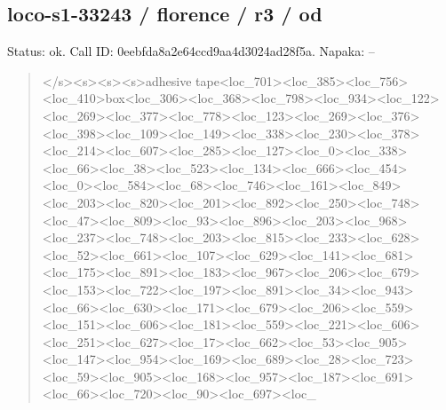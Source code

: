 \documentclass[10pt,a4paper]{article}
\begin{document}
\subsection*{loco-s1-33243 / florence / r3 / od}
Status: ok. Call ID: 0eebfda8a2e64ccd9aa4d3024ad28f5a. Napaka: --
\begin{quote}\footnotesize
</s>\allowbreak{}<s>\allowbreak{}<s>\allowbreak{}<s>\allowbreak{}adhesive tape<loc\_701>\allowbreak{}<loc\_385>\allowbreak{}<loc\_756>\allowbreak{}<\allowbreak{}loc\_410>\allowbreak{}box<loc\_306>\allowbreak{}<loc\_368>\allowbreak{}<lo\allowbreak{}c\_798>\allowbreak{}<loc\_934>\allowbreak{}<loc\_122>\allowbreak{}<loc\_269\allowbreak{}>\allowbreak{}<loc\_377>\allowbreak{}<loc\_778>\allowbreak{}<loc\_123>\allowbreak{}<loc\allowbreak{}\_269>\allowbreak{}<loc\_376>\allowbreak{}<loc\_398>\allowbreak{}<loc\_109>\allowbreak{}\allowbreak{}<loc\_149>\allowbreak{}<loc\_338>\allowbreak{}<loc\_230>\allowbreak{}<loc\_\allowbreak{}378>\allowbreak{}<loc\_214>\allowbreak{}<loc\_607>\allowbreak{}<loc\_285>\allowbreak{}<\allowbreak{}loc\_127>\allowbreak{}<loc\_0>\allowbreak{}<loc\_338>\allowbreak{}<loc\_66>\allowbreak{}\allowbreak{}<loc\_38>\allowbreak{}<loc\_523>\allowbreak{}<loc\_134>\allowbreak{}<loc\_6\allowbreak{}66>\allowbreak{}<loc\_454>\allowbreak{}<loc\_0>\allowbreak{}<loc\_584>\allowbreak{}<loc\allowbreak{}\_68>\allowbreak{}<loc\_746>\allowbreak{}<loc\_161>\allowbreak{}<loc\_849>\allowbreak{}<\allowbreak{}loc\_203>\allowbreak{}<loc\_820>\allowbreak{}<loc\_201>\allowbreak{}<loc\_8\allowbreak{}92>\allowbreak{}<loc\_250>\allowbreak{}<loc\_748>\allowbreak{}<loc\_47>\allowbreak{}<lo\allowbreak{}c\_809>\allowbreak{}<loc\_93>\allowbreak{}<loc\_896>\allowbreak{}<loc\_203>\allowbreak{}\allowbreak{}<loc\_968>\allowbreak{}<loc\_237>\allowbreak{}<loc\_748>\allowbreak{}<loc\_\allowbreak{}203>\allowbreak{}<loc\_815>\allowbreak{}<loc\_233>\allowbreak{}<loc\_628>\allowbreak{}<\allowbreak{}loc\_52>\allowbreak{}<loc\_661>\allowbreak{}<loc\_107>\allowbreak{}<loc\_62\allowbreak{}9>\allowbreak{}<loc\_141>\allowbreak{}<loc\_681>\allowbreak{}<loc\_175>\allowbreak{}<lo\allowbreak{}c\_891>\allowbreak{}<loc\_183>\allowbreak{}<loc\_967>\allowbreak{}<loc\_206\allowbreak{}>\allowbreak{}<loc\_679>\allowbreak{}<loc\_153>\allowbreak{}<loc\_722>\allowbreak{}<loc\allowbreak{}\_197>\allowbreak{}<loc\_891>\allowbreak{}<loc\_34>\allowbreak{}<loc\_943>\allowbreak{}<\allowbreak{}loc\_66>\allowbreak{}<loc\_630>\allowbreak{}<loc\_171>\allowbreak{}<loc\_67\allowbreak{}9>\allowbreak{}<loc\_206>\allowbreak{}<loc\_559>\allowbreak{}<loc\_151>\allowbreak{}<lo\allowbreak{}c\_606>\allowbreak{}<loc\_181>\allowbreak{}<loc\_559>\allowbreak{}<loc\_221\allowbreak{}>\allowbreak{}<loc\_606>\allowbreak{}<loc\_251>\allowbreak{}<loc\_627>\allowbreak{}<loc\allowbreak{}\_17>\allowbreak{}<loc\_662>\allowbreak{}<loc\_53>\allowbreak{}<loc\_905>\allowbreak{}<l\allowbreak{}oc\_147>\allowbreak{}<loc\_954>\allowbreak{}<loc\_169>\allowbreak{}<loc\_68\allowbreak{}9>\allowbreak{}<loc\_28>\allowbreak{}<loc\_723>\allowbreak{}<loc\_59>\allowbreak{}<loc\_\allowbreak{}905>\allowbreak{}<loc\_168>\allowbreak{}<loc\_957>\allowbreak{}<loc\_187>\allowbreak{}<\allowbreak{}loc\_691>\allowbreak{}<loc\_66>\allowbreak{}<loc\_720>\allowbreak{}<loc\_90\allowbreak{}>\allowbreak{}<loc\_697>\allowbreak{}<loc\_
\end{quote}
\end{document}
